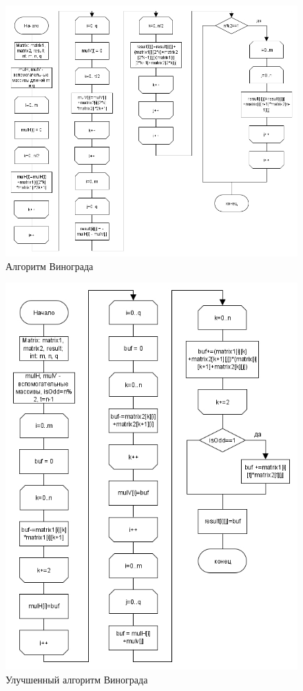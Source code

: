 \begin{figure}[H]
	\centering
	\includegraphics[width=1.05\linewidth]{src/winograd}
	\caption{Алгоритм Винограда}
	\label{fig:winograd}
\end{figure}
\begin{figure}[H]
	\centering
	\includegraphics[width=1.05\linewidth]{src/winogradOptimized}
	\caption{Улучшенный алгоритм Винограда}
	\label{fig:winograd}
\end{figure}
